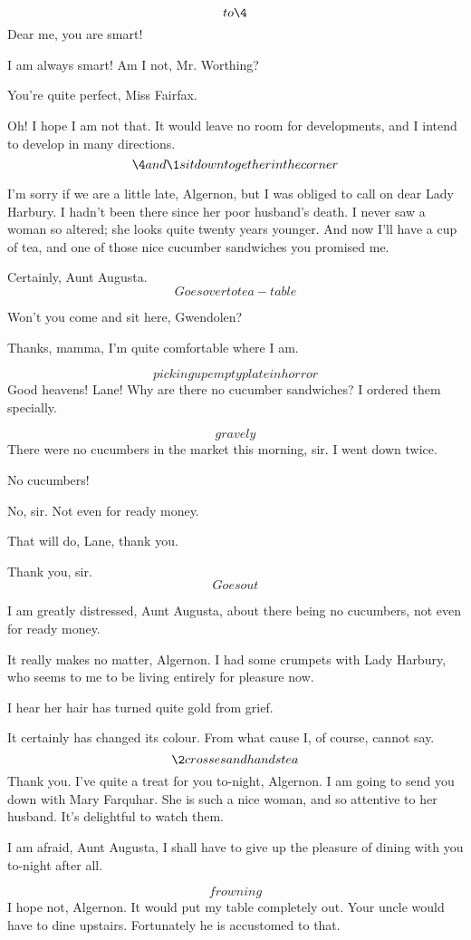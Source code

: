 \documentclass{book}
\begin{document}
\2  \[to \4\]  Dear me, you are smart!

\4  I am always smart!  Am I not, Mr. Worthing?

\1  You're quite perfect, Miss Fairfax.

\4  Oh! I hope I am not that.  It would leave no room for
developments, and I intend to develop in many directions.
\[\4 and \1 sit down together in the corner\]

\3  I'm sorry if we are a little late, Algernon, but I
was obliged to call on dear Lady Harbury.  I hadn't been there
since her poor husband's death.  I never saw a woman so altered;
she looks quite twenty years younger.  And now I'll have a cup of
tea, and one of those nice cucumber sandwiches you promised me.

\2  Certainly, Aunt Augusta.  \[Goes over to tea-table\]

\3  Won't you come and sit here, Gwendolen?

\4  Thanks, mamma, I'm quite comfortable where I am.

\2  \[picking up empty plate in horror\]  Good heavens!
Lane!  Why are there no cucumber sandwiches?  I ordered them
specially.

\8  \[gravely\]  There were no cucumbers in the market this
morning, sir.  I went down twice.

\2  No cucumbers!

\8  No, sir.  Not even for ready money.

\2  That will do, Lane, thank you.

\8  Thank you, sir.  \[Goes out\]

\2  I am greatly distressed, Aunt Augusta, about there being
no cucumbers, not even for ready money.

\3  It really makes no matter, Algernon.  I had some
crumpets with Lady Harbury, who seems to me to be living entirely
for pleasure now.

\2  I hear her hair has turned quite gold from grief.

\3  It certainly has changed its colour.  From what
cause I, of course, cannot say.\[\2 crosses and hands tea\]%
Thank you.  I've quite a treat for you to-night, Algernon.  I am
going to send you down with Mary Farquhar.  She is such a nice
woman, and so attentive to her husband.  It's delightful to watch
them.

\2  I am afraid, Aunt Augusta, I shall have to give up the
pleasure of dining with you to-night after all.

\3  \[frowning\]I hope not, Algernon.  It would put
my table completely out.  Your uncle would have to dine upstairs.
Fortunately he is accustomed to that.
\end{document}
